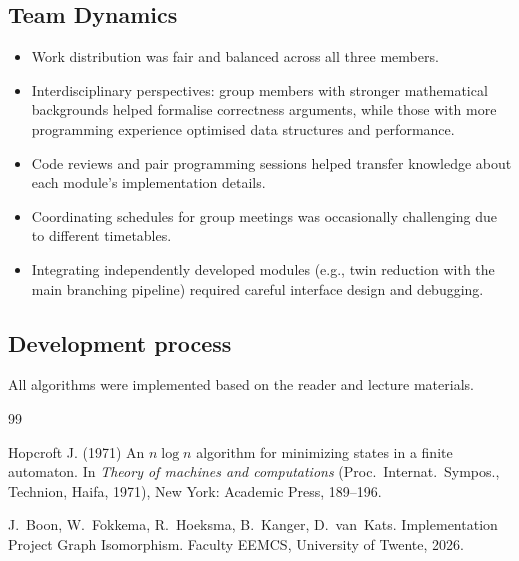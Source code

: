 \documentclass[twoside]{article}
\begin{document}
\subsection{Team Dynamics}

\begin{itemize}
\item[+] Work distribution was fair and balanced across all three members.
\item[+] Interdisciplinary perspectives: group members with stronger mathematical backgrounds helped formalise correctness arguments, while those with more programming experience optimised data structures and performance.
\item[+] Code reviews and pair programming sessions helped transfer knowledge about each module's implementation details.
\item[-] Coordinating schedules for group meetings was occasionally challenging due to different timetables.
\item[-] Integrating independently developed modules (e.g., twin reduction with the main branching pipeline) required careful interface design and debugging.
\end{itemize}


\subsection{Development process}

All algorithms were implemented based on the reader and lecture materials.




\begin{thebibliography}{99}

Hopcroft J. (1971) An $n\log n$ algorithm for minimizing states in a finite automaton. In \emph{Theory of machines and computations} (Proc.\ Internat.\ Sympos., Technion, Haifa, 1971), New York: Academic Press, 189--196.

J.~Boon, W.~Fokkema, R.~Hoeksma, B.~Kanger, D.~van~Kats.
\newblock Implementation Project Graph Isomorphism.
\newblock Faculty EEMCS, University of Twente, 2026.

\end{thebibliography}

\end{document}
